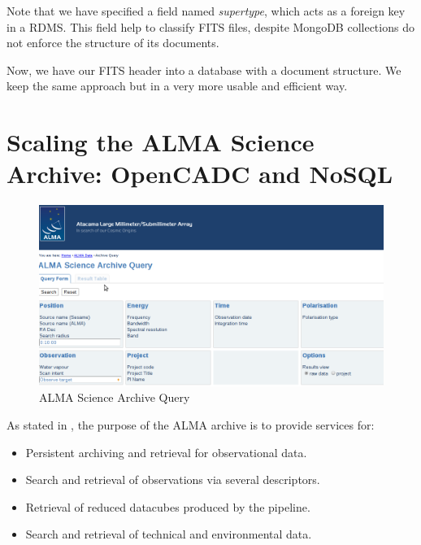 Note that we have specified a field named \emph{supertype}, which acts as a foreign key in a RDMS. This field help to classify FITS files, despite MongoDB collections do not enforce the structure of its documents.

Now, we have our FITS header into a database with a document structure. We keep the same approach but in a very more usable and efficient way.




\section{Scaling the ALMA Science Archive: OpenCADC and NoSQL} %
\label{sec:rewriting_the_alma_science_archive_with_nosql}

\begin{figure}
\centering
\includegraphics[width=\textwidth]{images/aq.png}
\caption{ALMA Science Archive Query}
\end{figure}

 
As stated in \cite{Etoka12}, the purpose of the ALMA archive is to provide services for:

\begin{itemize}

\item Persistent archiving and retrieval for observational data.

\item Search and retrieval of observations via several descriptors. %

\item Retrieval of reduced datacubes
produced by
the
pipeline.

\item Search and retrieval of technical and environmental data. %
\end{itemize}


